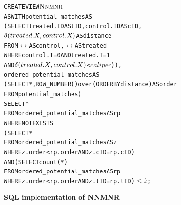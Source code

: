 \begin{figure}
  \centering
\begin{alltt} \scriptsize
CREATE VIEW \(\nnmnr\)
AS WITH potential_matches AS
  (SELECT treated.ID AS tID, control.ID AS cID,
          \(\delta(treated.\cv,control.\cv)\)  AS distance
   FROM \(\rel\) AS control, \(\rel\) AS treated
   WHERE control.T=0 AND treated.T=1
     AND \(\delta(treated.\cv,control.\cv)\) < \(caliper\))),
            ordered_potential_matches AS
  (SELECT *, ROW_NUMBER() over (ORDER BY distance) AS order
   FROM potential_matches)
SELECT *
FROM ordered_potential_matches AS rp
WHERE NOT EXISTS
    (SELECT *
     FROM ordered_potential_matches AS z
     WHERE z.order < rp.order AND z.cID=rp.cID)
  AND (SELECT count(*)
     FROM ordered_potential_matches AS rp
     WHERE z.order < rp.order AND z.tID=rp.tID)\( \leq k\);
\end{alltt} \vspace{-.3cm}
  \caption{\bf SQL implementation of NNMNR}\label{fig:nnmnr}
\end{figure}


